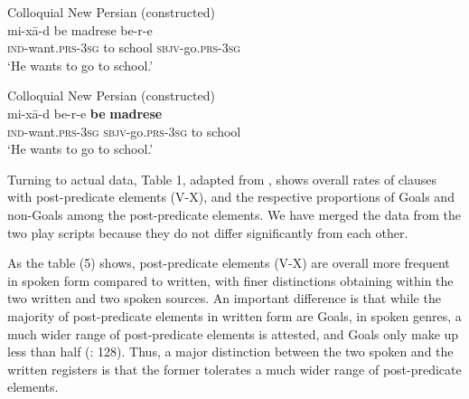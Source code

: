 \documentclass[output=paper,colorlinks,citecolor=brown,draftmode]{langscibook}
\begin{document}
\ea\label{Persian:ex:1}
Colloquial New Persian (constructed) \\
\gll mi-xā-d be madrese be-r-e \\
\textsc{ind-}want\textsc{.prs-3sg} to school \textsc{sbjv-}go\textsc{.prs-3sg} \\
\glt `He wants to go to school.'
\z

\ea\label{Persian:ex:2}
Colloquial New Persian (constructed) \\
\gll mi-xā-d be-r-e \textbf{be} \textbf{madrese} \\
\textsc{ind-}want\textsc{.prs-3sg} \textsc{sbjv-}go\textsc{.prs-3sg} to school \\
\glt `He wants to go to school.'
\z

Turning to  actual data, Table 1, adapted from \citet[127]{frommer_post-verbal_1981}, shows overall rates of clauses with post-predicate elements (V-X), and the respective proportions of Goals and non-Goals among the post-predicate elements. We have merged the data from the two play scripts because they do not differ significantly from each other.

\begin{table}
 \caption{Overall frequency of post-predicate elements and non-destination elements \cite[127]{frommer_post-verbal_1981}}
 \label{Persian:tab:1}
\end{table}

As the table (5) shows, post-predicate elements (V-X) are overall more frequent in spoken form compared to written, with finer distinctions obtaining within the two written and two spoken sources. An important difference is that while the majority of post-predicate elements in written form are Goals, in spoken genres, a much wider range of post-predicate elements is attested, and Goals only make up less than half (\citealt{frommer_post-verbal_1981}: 128). Thus, a major distinction between the two spoken and the written registers is that the former tolerates a much wider range of post-predicate elements. 
\end{document}
